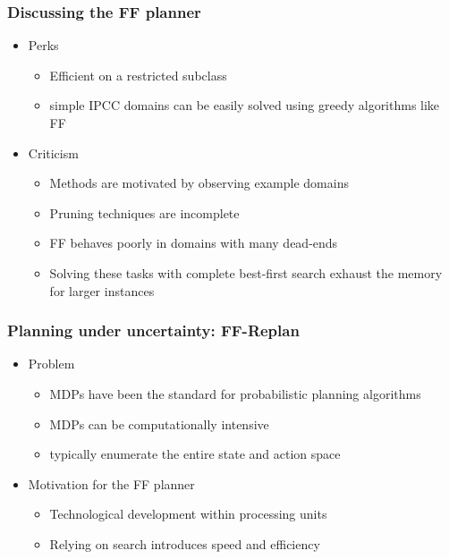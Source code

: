 \documentclass{beamer}
\let\origframetitle=\frametitle
\renewcommand\frametitle[1]{\origframetitle{\textbf{\large{\textrm{#1}}}}}
\begin{document}
\begin{frame}
  \frametitle{Discussing the FF planner}

\begin{itemize}
\item  Perks
  \begin{itemize}
    \item Efficient on a restricted subclass
    \item simple IPCC domains can be easily solved using greedy algorithms like FF
  \end{itemize}
\item Criticism
  \begin{itemize}
    \item Methods are motivated by observing example domains
    \item Pruning techniques are incomplete
    \item FF behaves poorly in domains with many dead-ends
    \item Solving these tasks with complete best-first search exhaust the memory for larger instances
  \end{itemize}
\end{itemize}
\end{frame}


\begin{frame}
  \frametitle{Planning under uncertainty: FF-Replan}

  \begin{itemize}
    \item Problem
      \begin{itemize}
        \item MDPs have been the standard for probabilistic planning algorithms
        \item MDPs can be computationally intensive
        \item typically enumerate the entire state and action space
      \end{itemize}
    \item Motivation for the FF planner
      \begin{itemize}
        \item Technological development within processing units
        \item Relying on search introduces speed and efficiency
      \end{itemize}
  \end{itemize}
\end{frame}
\end{document}
